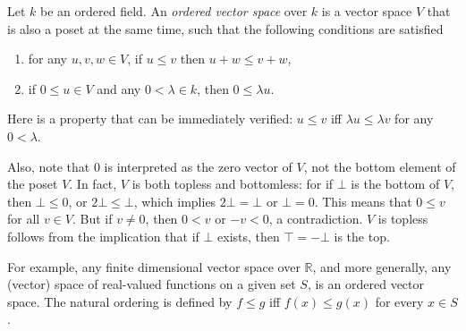 \documentclass[12pt]{article}
\begin{document}
Let $k$ be an ordered field.  An \emph{ordered vector space} over $k$ is a vector space $V$ that is also a poset at the same time, such that the following conditions are satisfied
\begin{enumerate}
\item for any $u,v,w\in V$, if $u\le v$ then $u+w\le v+w$,
\item if $0\le u\in V$ and any $0< \lambda \in k$, then $0\le \lambda u$.
\end{enumerate}

Here is a property that can be immediately verified: $u\le v$ iff $\lambda u\le \lambda v$ for any $0< \lambda$.

Also, note that $0$ is interpreted as the zero vector of $V$, not the bottom element of the poset $V$.  In fact, $V$ is both topless and bottomless: for if $\bot$ is the bottom of $V$, then $\bot\le 0$, or $2\bot\le \bot$, which implies $2\bot=\bot$ or $\bot=0$.  This means that $0\le v$ for all $v\in V$.  But if $v\ne 0$, then $0<v$ or $-v<0$, a contradiction.  $V$ is topless follows from the implication that if $\bot$ exists, then $\top=-\bot$ is the top.

For example, any finite dimensional vector space over $\mathbb{R}$, and more generally, any (vector) space of real-valued functions on a given set $S$, is an ordered vector space.  The natural ordering is defined by $f\le g$ iff $f(x)\le g(x)$ for every $x\in S$.
\end{document}
